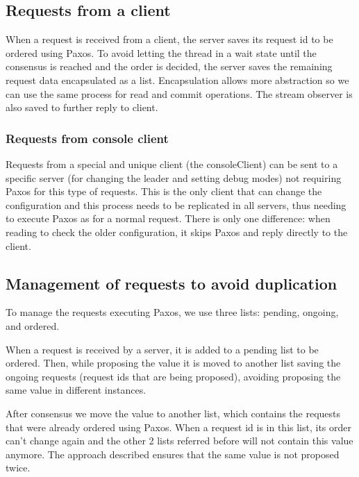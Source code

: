 \documentclass[times, 10pt,twocolumn]{article}
\begin{document}
\subsection{Requests from a client}

When a request is received from a client, the server saves its request id to be ordered using Paxos. To avoid letting the thread in a wait state until the consensus is reached and the order is decided, the server saves the remaining request data encapsulated as a list. Encapsulation allows more abstraction so we can use the same process for read and commit operations. The stream observer is also saved to further reply to client.

\subsubsection{Requests from console client}

Requests from a special and unique client (the consoleClient) can be sent to a specific server (for changing the leader and setting debug modes) not requiring Paxos for this type of requests. This is the only client that can change the configuration and this process needs to be replicated in all servers, thus needing to execute Paxos as for a normal request. There is only one difference: when reading to check the older configuration, it skips Paxos and reply directly to the client.

\subsection{Management of requests to avoid duplication}

To manage the requests executing Paxos, we use three lists: pending, ongoing, and ordered.

When a request is received by a server, it is added to a pending list to be ordered. Then, while proposing the value it is moved to another list saving the ongoing requests (request ids that are being proposed), avoiding proposing the same value in different instances.

After consensus we move the value to another list, which contains the  requests that were already ordered using Paxos. When a request id is in this list, its order can't change again and the other 2 lists referred before will not contain this value anymore. The approach described ensures that the same value is not proposed twice.
\end{document}
